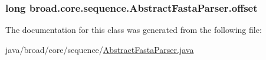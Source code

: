 \hypertarget{classbroad_1_1core_1_1sequence_1_1_abstract_fasta_parser_ad28fe00d981c2bcf4ed2fcb94d92a85d}{
\subsubsection[{offset}]{\setlength{\rightskip}{0pt plus 5cm}long broad.\+core.\+sequence.\+Abstract\+Fasta\+Parser.\+offset\hspace{0.3cm}{\ttfamily [protected]}}}\label{classbroad_1_1core_1_1sequence_1_1_abstract_fasta_parser_ad28fe00d981c2bcf4ed2fcb94d92a85d}


The documentation for this class was generated from the following file\+:\begin{DoxyCompactItemize}
\item 
java/broad/core/sequence/\hyperlink{_abstract_fasta_parser_8java}{Abstract\+Fasta\+Parser.\+java}\end{DoxyCompactItemize}
